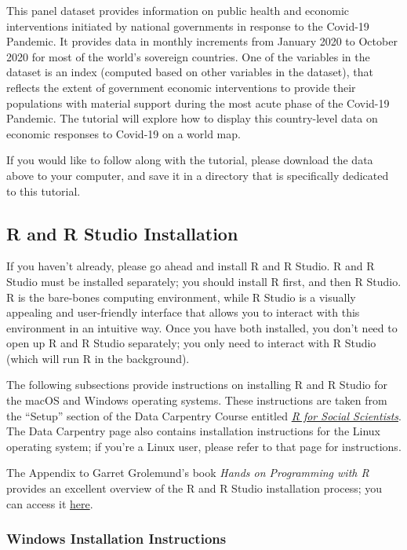 \documentclass[
]{article}
\begin{document}
This panel dataset provides information on public health and economic interventions initiated by national governments in response to the Covid-19 Pandemic. It provides data in monthly increments from January 2020 to October 2020 for most of the world's sovereign countries. One of the variables in the dataset is an index (computed based on other variables in the dataset), that reflects the extent of government economic interventions to provide their populations with material support during the most acute phase of the Covid-19 Pandemic. The tutorial will explore how to display this country-level data on economic responses to Covid-19 on a world map.

If you would like to follow along with the tutorial, please download the data above to your computer, and save it in a directory that is specifically dedicated to this tutorial.

\hypertarget{r-and-r-studio-installation}{%
\subsection{R and R Studio Installation}\label{r-and-r-studio-installation}}

If you haven't already, please go ahead and install R and R Studio. R and R Studio must be installed separately; you should install R first, and then R Studio. R is the bare-bones computing environment, while R Studio is a visually appealing and user-friendly interface that allows you to interact with this environment in an intuitive way. Once you have both installed, you don't need to open up R and R Studio separately; you only need to interact with R Studio (which will run R in the background).

The following subsections provide instructions on installing R and R Studio for the macOS and Windows operating systems. These instructions are taken from the ``Setup'' section of the Data Carpentry Course entitled \href{https://datacarpentry.org/r-socialsci/setup.html}{\emph{R for Social Scientists}}. The Data Carpentry page also contains installation instructions for the Linux operating system; if you're a Linux user, please refer to that page for instructions.

The Appendix to Garret Grolemund's book \emph{Hands on Programming with R} provides an excellent overview of the R and R Studio installation process; you can access it \href{https://rstudio-education.github.io/hopr/}{here}.

\hypertarget{windows-installation-instructions}{%
\subsubsection{Windows Installation Instructions}\label{windows-installation-instructions}}
\end{document}
